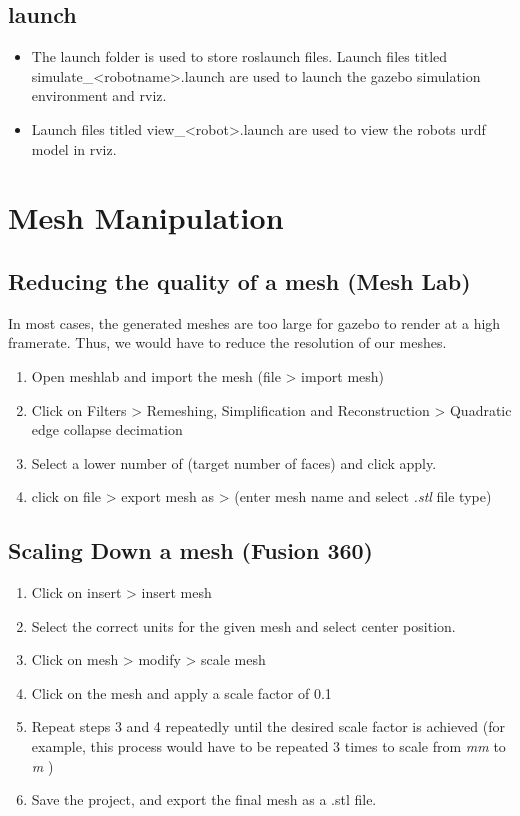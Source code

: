 \documentclass[11pt]{article}
\begin{document}
\subsection{launch}
\begin{itemize}
 \item{
       
       The launch folder is used to store roslaunch files. Launch files titled simulate\_<robotname>.launch are used to launch the gazebo simulation environment and rviz.
       }
 \item{
       Launch files titled view\_<robot>.launch are used to view the robots urdf model in rviz.
       }
\end{itemize}



\section{Mesh Manipulation}
\subsection{Reducing the quality of a mesh (Mesh Lab)}
In most cases, the generated meshes are too large for gazebo to render at a high framerate. Thus, we would have to reduce the resolution of our meshes.
\begin{enumerate}
 \item {
       Open meshlab and import the mesh (file > import mesh)
       }
 \item{
       Click on Filters > Remeshing, Simplification and Reconstruction >  Quadratic edge collapse decimation
       }
 \item{
       Select a lower number of (target number of faces) and click apply.
       }
 \item{
       click on file > export mesh as > (enter mesh name and select \emph{.stl} file type)
       }
\end{enumerate}
\subsection{Scaling Down a mesh (Fusion 360) }
\begin{enumerate}
 \item {
       Click on insert > insert mesh
       }
 \item {
       Select the correct units for the given mesh and select center position.
       }
 \item {
       Click on mesh > modify > scale mesh
       }
 \item {
       Click on the mesh and apply a scale factor of 0.1
       }
 \item {
       Repeat steps 3 and 4 repeatedly until the desired scale factor is achieved (for example, this process would have to be repeated 3 times to scale from \emph{mm} to \emph{m} )
       }
 \item{
       Save the project, and export the final mesh as a .stl file.
       }
\end{enumerate}
\end{document}
